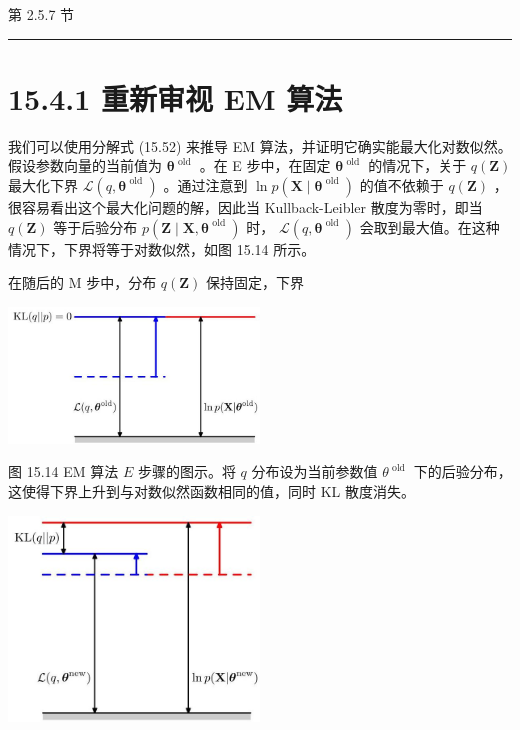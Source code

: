 \documentclass[10pt]{article}
\newcommand{\HRule}{\begin{center}\rule{0.9\linewidth}{0.2mm}\end{center}}
\begin{document}
第 2.5.7 节

\HRule

\section*{15.4.1 重新审视 EM 算法}

我们可以使用分解式 (15.52) 来推导 EM 算法，并证明它确实能最大化对数似然。假设参数向量的当前值为 \({\mathbf{\theta }}^{\text{ old }}\) 。在 E 步中，在固定 \({\mathbf{\theta }}^{\text{ old }}\) 的情况下，关于 \(q\left( \mathbf{Z}\right)\) 最大化下界 \(\mathcal{L}\left( {q,{\mathbf{\theta }}^{\text{ old }}}\right)\) 。通过注意到 \(\ln p\left( {\mathbf{X} \mid  {\mathbf{\theta }}^{\text{ old }}}\right)\) 的值不依赖于 \(q\left( \mathbf{Z}\right)\) ，很容易看出这个最大化问题的解，因此当 Kullback-Leibler 散度为零时，即当 \(q\left( \mathbf{Z}\right)\) 等于后验分布 \(p\left( {\mathbf{Z} \mid  \mathbf{X},{\mathbf{\theta }}^{\text{ old }}}\right)\) 时， \(\mathcal{L}\left( {q,{\mathbf{\theta }}^{\text{ old }}}\right)\) 会取到最大值。在这种情况下，下界将等于对数似然，如图 15.14 所示。

在随后的 M 步中，分布 \(q\left( \mathbf{Z}\right)\) 保持固定，下界

\begin{center}
\includegraphics[max width=0.5\textwidth]{images/0194e279-9b28-703a-88f4-c3ac21e2010d_505_830_1610_722_393_0.jpg}
\end{center}
\hspace*{3em} 

图 15.14 EM 算法 \(E\) 步骤的图示。将 \(q\) 分布设为当前参数值 \({\theta }^{\text{ old }}\) 下的后验分布，这使得下界上升到与对数似然函数相同的值，同时 KL 散度消失。

\begin{center}
\includegraphics[max width=0.5\textwidth]{images/0194e279-9b28-703a-88f4-c3ac21e2010d_506_925_343_624_511_0.jpg}
\end{center}
\hspace*{3em} 
\end{document}
